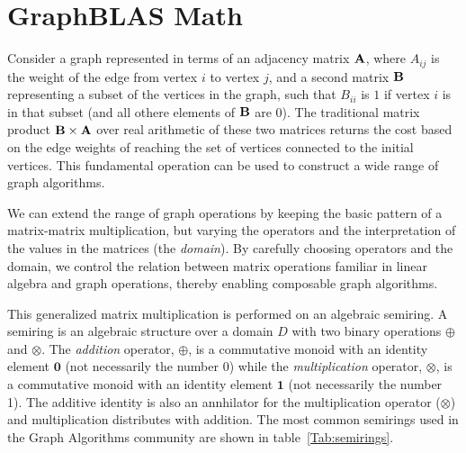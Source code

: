 \section{GraphBLAS Math}
\label{sec:math}

Consider a graph represented in terms of an adjacency matrix ${\bf A}$,
where $A_{ij}$ is the weight of the edge from vertex $i$ to vertex $j$,
and a second matrix ${\bf B}$ representing a subset of the vertices
in the graph, such that $B_{ii}$ is $1$ if vertex $i$ is in that subset
(and all othere elements of ${\bf B}$ are 0).  The traditional matrix
product ${\bf B} \times {\bf A}$ over real arithmetic of these two matrices returns the cost
based on the edge weights of reaching the set of vertices
connected to the initial vertices.   This fundamental operation can be
used to construct a wide range of graph algorithms.

We can extend the range of graph operations by keeping the basic
pattern of a matrix-matrix multiplication, but varying
the operators and the interpretation of the values in the matrices (the \emph{domain}).
By carefully choosing operators and the domain, we control the
relation between matrix operations familiar in linear algebra and graph operations, thereby enabling
composable graph algorithms.

This generalized matrix multiplication is performed on an algebraic semiring.   A semiring is an algebraic
structure over a domain $D$ with two binary operations $\oplus$ and $\otimes$.
The \emph{addition} operator, $\oplus$, is a commutative monoid with an identity element $\mathbf{0}$ (not necessarily the number 0)
while the \emph{multiplication} operator, $\otimes$, is a commutative monoid with an 
identity element $\mathbf{1}$ (not necessarily the number 1).  The additive identity is also an annhilator for the multiplication 
operator ($\otimes$) and multiplication distributes with addition.  The most 
common semirings used in the Graph Algorithms community are 
shown in table~\ref{Tab:semirings}.
  
